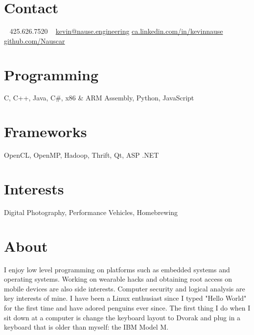 \documentclass[print]{friggeri-cv} %
\begin{document}


\begin{aside} %
\section{Contact}
~
425.626.7520
~
{\scriptsize \href{mailto:kevin@nause.engineering}{kevin@nause.engineering}}
{\scriptsize \href{https://ca.linkedin.com/in/kevinnause}{ca.linkedin.com/in/kevinnause}}
{\scriptsize \href{https://github.com/Nauscar}{github.com/Nauscar}}
\section{Programming}
C, C++, Java, C\#, 
x86 \& ARM Assembly, 
Python, JavaScript
\section{Frameworks}
OpenCL, OpenMP,
Hadoop, Thrift, 
Qt, ASP .NET
\section{Interests}
{Digital Photography, Performance Vehicles, Homebrewing}
\section{About}
{I enjoy low level programming on platforms such as embedded systems and operating systems.
Working on wearable hacks and obtaining root access on mobile devices are also side interests. 
Computer security and logical analysis are key interests of mine. 
I have been a Linux enthusiast since I typed "Hello World" for the first time and have adored penguins ever since. 
The first thing I do when I sit down at a computer is change the keyboard layout to Dvorak and plug in a keyboard that is older than myself: the IBM Model M.}
\end{aside}

\end{document}
